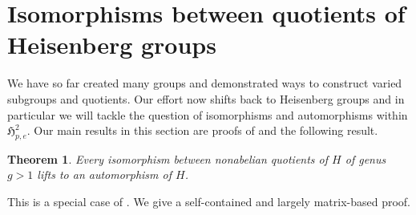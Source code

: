 \documentclass{toc}
\numberwithin{equation}{section}
\theoremstyle{plain}       %
\newtheorem{thm}[equation]{Theorem}
\theoremstyle{remark}
\theoremstyle{definition}
\numberwithin{figure}{section}
\numberwithin{table}{section}
\newcommand{\mygroups}{\mathfrak{H}}
\begin{document}
%
\section{Isomorphisms between quotients of Heisenberg groups}
We have so far created many groups and demonstrated ways to construct varied
subgroups and quotients.  Our effort now shifts back to Heisenberg groups and in
particular we will tackle the question of isomorphisms and automorphisms within
$\mygroups_{p,e}^{2}$.  Our main results in this section are proofs of
 and the following result.

\begin{thm}\label{thm:adj-tensor}
	Every isomorphism between nonabelian quotients of $H$ of genus $g>1$ lifts
	to an automorphism of $H$.
\end{thm}

This is a special case of \cite[Theorem~4.4]{LW}. We give a self-contained and
largely matrix-based proof.
\end{document}
